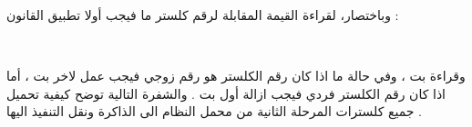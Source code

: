 \documentclass[document.tex]{subfiles}
\begin{document}
وباختصار، لقراءة القيمة المقابلة لرقم كلستر ما فيجب أولا تطبيق القانون :\\
\begin{english}
\\
\end{english}

 وقراءة  بت ، وفي حالة ما اذا كان رقم الكلستر هو رقم زوجي فيجب عمل  لاخر  بت ، أما اذا كان رقم الكلستر فردي فيجب ازالة أول  بت . والشفرة التالية توضح كيفية تحميل جميع كلسترات المرحلة الثانية من محمل النظام الى الذاكرة ونقل التنفيذ اليها .

\begin{english}
\lstset{numberstyle=\tiny,numbersep=5pt,tabsize=2,extendedchars=true,breaklines=true,frame=b,showspaces=false, showtabs=false,xleftmargin=10pt,framexleftmargin=10pt,framexrightmargin=5pt,framexbottommargin=4pt,showstringspaces=false,language=[x86masm]Assembler}


\end{english}
\end{document}
